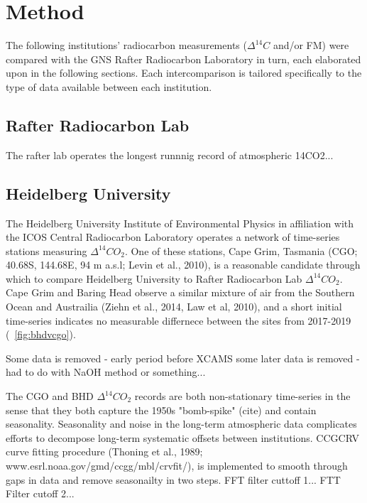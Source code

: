 \section{Method}
\label{sec:method}


The following institutions' radiocarbon measurements (${\Delta^{14}C}$ and/or FM) 
 were compared with the GNS Rafter Radiocarbon Laboratory in turn, each elaborated upon in the following sections. Each intercomparison is tailored specifically to the type of data available between each institution. 

\subsection{Rafter Radiocarbon Lab}

The rafter lab operates the longest runnnig record of atmospheric 14CO2...

\subsection{Heidelberg University}

The Heidelberg University Institute of Environmental Physics in affiliation with the ICOS Central Radiocarbon Laboratory operates a network of time-series stations measuring ${\Delta^{14}CO_{2}}$. One of these stations, Cape Grim, Tasmania (CGO; 40.68S, 144.68E, 94 m a.s.l; Levin et al., 2010), is a reasonable candidate through which to compare Heidelberg University to Rafter Radiocarbon Lab ${\Delta^{14}CO_{2}}$. Cape Grim and Baring Head observe a similar mixture of air from the Southern Ocean and Austrailia (Ziehn et al., 2014, Law et al, 2010), and a short initial time-series indicates no measurable differnece between the sites from 2017-2019 (~\ref{fig:bhdvcgo}). 

Some data is removed - early period before XCAMS
some later data is removed - had to do with NaOH method or something...

The CGO and BHD ${\Delta^{14}CO_{2}}$ records are both non-stationary time-series in the sense that they both capture the 1950s "bomb-spike" (cite) and contain seasonality. Seasonality and noise in the long-term atmospheric data complicates efforts to decompose long-term systematic offsets between institutions. 
CCGCRV curve fitting procedure (Thoning et al., 1989; www.esrl.noaa.gov/gmd/ccgg/mbl/crvfit/), is implemented to smooth through gaps in data and remove seasonailty in two steps. 
FFT filter cuttoff 1...
FTT Filter cutoff 2...

